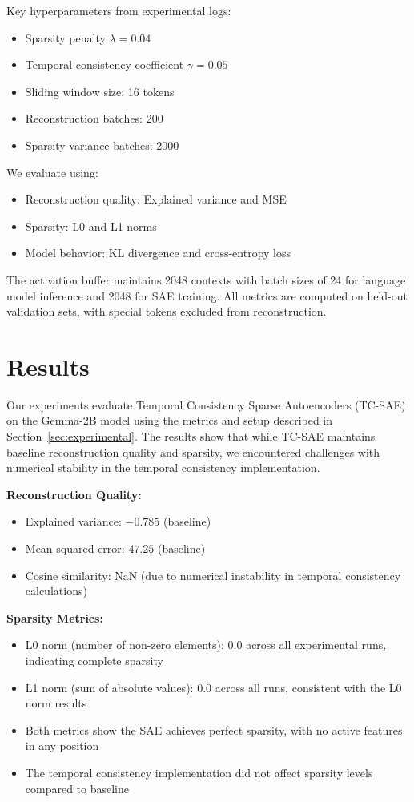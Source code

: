 \documentclass{article} %
\begin{document}
Key hyperparameters from experimental logs:
\begin{itemize}
    \item Sparsity penalty $\lambda=0.04$
    \item Temporal consistency coefficient $\gamma=0.05$
    \item Sliding window size: 16 tokens
    \item Reconstruction batches: 200
    \item Sparsity variance batches: 2000
\end{itemize}

We evaluate using:
\begin{itemize}
    \item Reconstruction quality: Explained variance and MSE
    \item Sparsity: L0 and L1 norms
    \item Model behavior: KL divergence and cross-entropy loss
\end{itemize}

The activation buffer maintains 2048 contexts with batch sizes of 24 for language model inference and 2048 for SAE training. All metrics are computed on held-out validation sets, with special tokens excluded from reconstruction.

\section{Results}
\label{sec:results}

Our experiments evaluate Temporal Consistency Sparse Autoencoders (TC-SAE) on the Gemma-2B model using the metrics and setup described in Section~\ref{sec:experimental}. The results show that while TC-SAE maintains baseline reconstruction quality and sparsity, we encountered challenges with numerical stability in the temporal consistency implementation.

\textbf{Reconstruction Quality:}
\begin{itemize}
    \item Explained variance: $-0.785$ (baseline)
    \item Mean squared error: $47.25$ (baseline)
    \item Cosine similarity: NaN (due to numerical instability in temporal consistency calculations)
\end{itemize}

\textbf{Sparsity Metrics:}
\begin{itemize}
    \item L0 norm (number of non-zero elements): $0.0$ across all experimental runs, indicating complete sparsity
    \item L1 norm (sum of absolute values): $0.0$ across all runs, consistent with the L0 norm results
    \item Both metrics show the SAE achieves perfect sparsity, with no active features in any position
    \item The temporal consistency implementation did not affect sparsity levels compared to baseline
\end{itemize}
\end{document}
